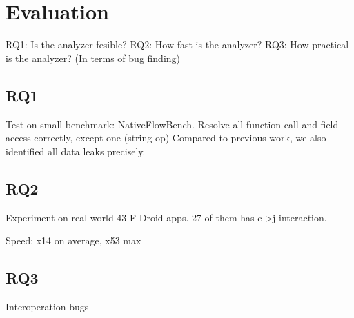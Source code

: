 \section{Evaluation}

RQ1: Is the analyzer fesible?
RQ2: How fast is the analyzer?
RQ3: How practical is the analyzer? (In terms of bug finding)

\subsection{RQ1}
Test on small benchmark: NativeFlowBench.
Resolve all function call and field access correctly, except one (string op)
Compared to previous work, we also identified all data leaks precisely.

\subsection{RQ2}
Experiment on real world 43 F-Droid apps.
27 of them has c->j interaction.

Speed: x14 on average, x53 max

\subsection{RQ3}
Interoperation bugs
